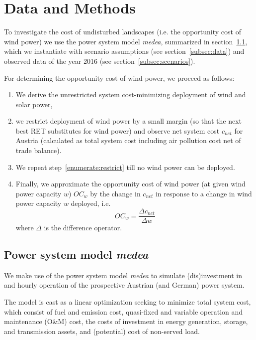 \documentclass[final, 3p, times]{elsarticle} %
\begin{document}


    \section{Data and Methods} \label{sec:data-and-methods}
    To investigate the cost of undisturbed landscapes (i.e. the opportunity cost of wind power) we use the power system
    model \emph{medea}, summarized in section~\ref{subsec:medea}, which we instantiate with scenario assumptions
    (see section~\ref{subsec:data}) and observed data of the year 2016 (see section~\ref{subsec:scenarios}).

    For determining the opportunity cost of wind power, we proceed as follows:
    \begin{enumerate}
        \item We derive the unrestricted system cost-minimizing deployment of wind and solar power,
        \item we restrict deployment of wind power by a small margin (so that the next best RET substitutes for wind power)
        and observe net system cost $c_{net}$ for Austria (calculated as total system cost including air pollution cost
        net of trade balance).\label{enumerate:restrict}
        \item We repeat step~\ref{enumerate:restrict} till no wind power can be deployed.
        \item Finally, we approximate the opportunity cost of wind power (at given wind power capacity $w$) $OC_w$ by
        the change in $c_{net}$ in response to a change in wind power capacity $w$ deployed, i.e.\
        \[OC_w = \frac{\Delta c_{net}}{\Delta w}\]
        where $\Delta$ is the difference operator.
    \end{enumerate}


    \subsection{Power system model \emph{medea}} \label{subsec:medea}
    We make use of the power system model \emph{medea} to simulate (dis)investment in and hourly operation of the
    prospective Austrian (and German) power system.

    The model is cast as a linear optimization seeking to minimize total system cost, which consist of fuel and emission
    cost, quasi-fixed and variable operation and maintenance (O\&M) cost, the costs of investment in energy generation,
    storage, and transmission assets, and (potential) cost of non-served load.
\end{document}
